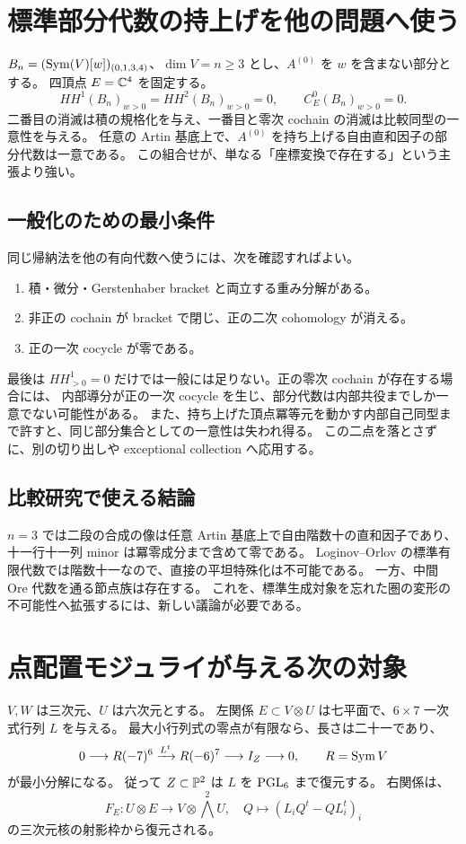 \section{標準部分代数の持上げを他の問題へ使う}

$B_n=(\operatorname{Sym}(V)[w])_{(0,1,3,4)}$、$\dim V=n\ge3$ とし、$A^{(0)}$ を $w$ を含まない部分とする。
四頂点 $E=\mathbb C^4$ を固定する。
\[
 HH^1(B_n)_{w>0}=HH^2(B_n)_{w>0}=0,
 \qquad C^0_E(B_n)_{w>0}=0.
\]
二番目の消滅は積の規格化を与え、一番目と零次 cochain の消滅は比較同型の一意性を与える。
任意の Artin 基底上で、$A^{(0)}$ を持ち上げる自由直和因子の部分代数は一意である。
この組合せが、単なる「座標変換で存在する」という主張より強い。

\subsection{一般化のための最小条件}
同じ帰納法を他の有向代数へ使うには、次を確認すればよい。
\begin{enumerate}
\item 積・微分・Gerstenhaber bracket と両立する重み分解がある。
\item 非正の cochain が bracket で閉じ、正の二次 cohomology が消える。
\item 正の一次 cocycle が零である。
\end{enumerate}
最後は $HH^1_{>0}=0$ だけでは一般には足りない。正の零次 cochain が存在する場合には、
内部導分が正の一次 cocycle を生じ、部分代数は内部共役までしか一意でない可能性がある。
また、持ち上げた頂点冪等元を動かす内部自己同型まで許すと、同じ部分集合としての一意性は失われ得る。
この二点を落とさずに、別の切り出しや exceptional collection へ応用する。

\subsection{比較研究で使える結論}
$n=3$ では二段の合成の像は任意 Artin 基底上で自由階数十の直和因子であり、
十一行十一列 minor は冪零成分まで含めて零である。
Loginov--Orlov の標準有限代数では階数十一なので、直接の平坦特殊化は不可能である。
一方、中間 Ore 代数を通る節点族は存在する。
これを、標準生成対象を忘れた圏の変形の不可能性へ拡張するには、新しい議論が必要である。

\section{点配置モジュライが与える次の対象}

$V,W$ は三次元、$U$ は六次元とする。
左関係 $E\subset V\otimes U$ は七平面で、$6\times7$ 一次式行列 $L$ を与える。
最大小行列式の零点が有限なら、長さは二十一であり、
\[
 0\longrightarrow R(-7)^6\xrightarrow{L^t}R(-6)^7
 \longrightarrow I_Z\longrightarrow0,\qquad R=\operatorname{Sym} V
\]
が最小分解になる。
従って $Z\subset\mathbb P^2$ は $L$ を $\operatorname{PGL}_6$ まで復元する。
右関係は、
\[
 F_E:U\otimes E\longrightarrow V\otimes\bigwedge^2U,
 \quad Q\longmapsto(L_iQ^t-QL_i^t)_i
\]
の三次元核の射影枠から復元される。

